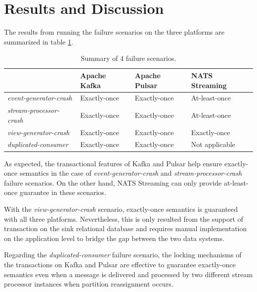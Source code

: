 \section{Results and Discussion}
The results from running the failure scenarios on the three platforms are summarized in table \ref{fig:failurescenariosresult}.
\begin{table}[h]
	\centering
	\begin{tabular}{|l|l|l|l|}
		\hline
		& Apache Kafka & Apache Pulsar & NATS Streaming \\ \hline
		\textit{event-generator-crash}  & Exactly-once & Exactly-once  & At-least-once  \\ \hline
		\textit{stream-processor-crash} & Exactly-once & Exactly-once  & At-least-once  \\ \hline
		\textit{view-generator-crash}   & Exactly-once & Exactly-once  & Exactly-once   \\ \hline
		\textit{duplicated-consumer}    & Exactly-once & Exactly-once  & Not applicable \\ \hline
	\end{tabular}
	\caption{Summary of 4 failure scenarios.}
	\label{fig:failurescenariosresult}
\end{table}

As expected, the transactional features of Kafka and Pulsar help ensure exactly-once semantics in the case of \emph{event-generator-crash} and \emph{stream-processor-crash} failure scenarios. On the other hand, NATS Streaming can only provide at-least-once guarantee in these scenarios.  

With the \emph{view-generator-crash} scenario, exactly-once semantics is guaranteed with all three platforms. Nevertheless, this is only resulted from the support of transaction on the sink relational database and requires manual implementation on the application level to bridge the gap between the two data systems. 

Regarding the \emph{duplicated-consumer} failure scenario, the locking mechanisms of the transactions on Kafka and Pulsar are effective to guarantee exactly-once semantics even when a message is delivered and processed by two different stream processor instances when partition reassignment occurs. 

